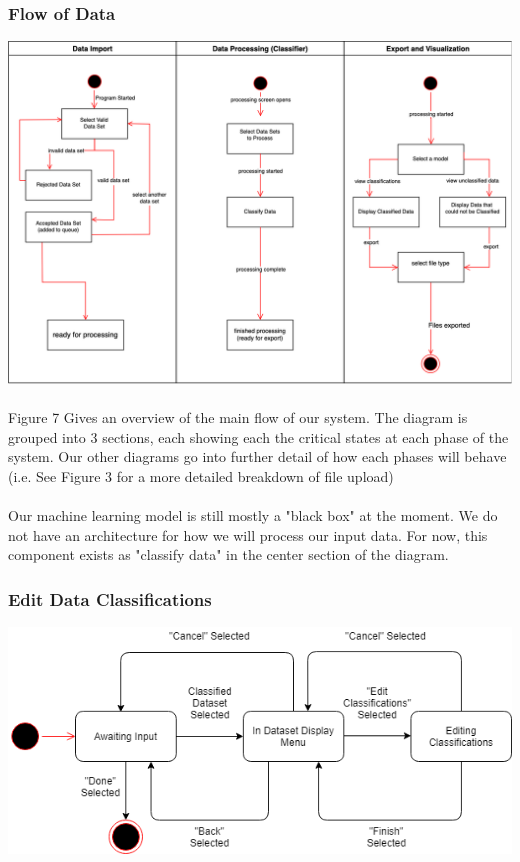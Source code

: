 \documentclass[12pt,oneside,letterpaper]{article}
\begin{document}
 \subsubsection{Flow of Data}
\includegraphics[scale = 0.40]{LandonStateDiagram.png}
\begingroup
{}
\endgroup

\paragraph{}Figure 7 Gives an overview of the main flow of our system. The diagram is grouped into 3 sections, each showing each the critical states at each phase of the system. Our other diagrams go into further detail of how each phases will behave (i.e. See Figure 3 for a more detailed breakdown of file upload)

\paragraph{}Our machine learning model is still mostly a "black box" at the moment. We do not have an architecture for how we will process our input data. For now, this component exists as "classify data" in the center section of the diagram.

 \subsubsection{Edit Data Classifications}
\includegraphics[scale = 0.70]{bread_state_diagram.png}
\begingroup
{}
\endgroup
\end{document}
